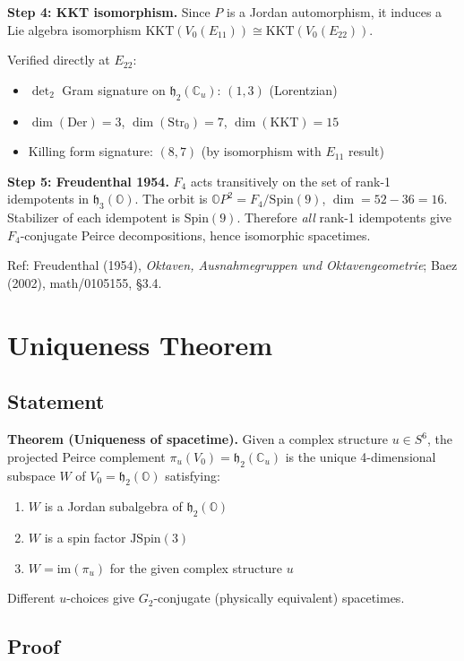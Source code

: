 \textbf{Step 4: KKT isomorphism.}
Since $P$ is a Jordan automorphism, it induces a Lie algebra isomorphism
$\mathrm{KKT}(V_0(E_{11})) \cong \mathrm{KKT}(V_0(E_{22}))$.

Verified directly at $E_{22}$:
\begin{itemize}
  \item $\det_2$ Gram signature on $\mathfrak{h}_2(\mathbb{C}_u)$: $(1,3)$ (Lorentzian)
  \item $\dim(\mathrm{Der}) = 3$, $\dim(\mathrm{Str}_0) = 7$, $\dim(\mathrm{KKT}) = 15$
  \item Killing form signature: $(8,7)$ (by isomorphism with $E_{11}$ result)
\end{itemize}

\textbf{Step 5: Freudenthal 1954.}
$F_4$ acts transitively on the set of rank-1 idempotents in
$\mathfrak{h}_3(\mathbb{O})$. The orbit is $\mathbb{O}P^2 = F_4/\mathrm{Spin}(9)$,
$\dim = 52 - 36 = 16$. Stabilizer of each idempotent is $\mathrm{Spin}(9)$.
Therefore \emph{all} rank-1 idempotents give $F_4$-conjugate Peirce
decompositions, hence isomorphic spacetimes.

Ref: Freudenthal (1954), \emph{Oktaven, Ausnahmegruppen und Oktavengeometrie};
Baez (2002), math/0105155, \S3.4.


\section{Uniqueness Theorem}

\subsection{Statement}

\textbf{Theorem (Uniqueness of spacetime).}
Given a complex structure $u \in S^6$, the projected Peirce complement
$\pi_u(V_0) = \mathfrak{h}_2(\mathbb{C}_u)$ is the unique 4-dimensional
subspace $W$ of $V_0 = \mathfrak{h}_2(\mathbb{O})$ satisfying:
\begin{enumerate}
  \item[(U1)] $W$ is a Jordan subalgebra of $\mathfrak{h}_2(\mathbb{O})$
  \item[(U2)] $W$ is a spin factor $\mathrm{JSpin}(3)$
  \item[(U3)] $W = \mathrm{im}(\pi_u)$ for the given complex structure $u$
\end{enumerate}
Different $u$-choices give $G_2$-conjugate (physically equivalent) spacetimes.

\subsection{Proof}

